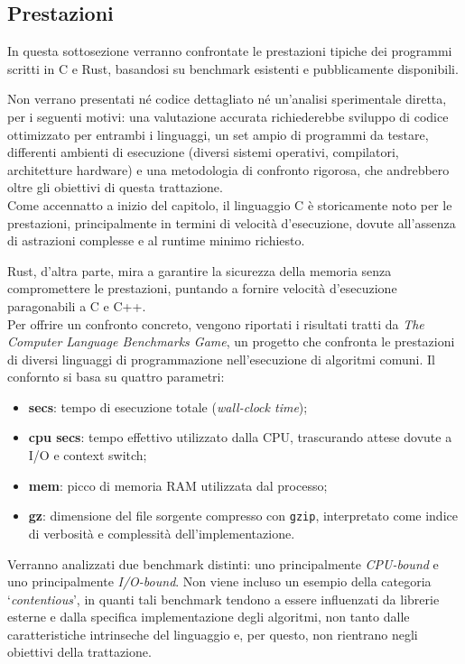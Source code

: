 \subsection{Prestazioni}
In questa sottosezione verranno confrontate le prestazioni tipiche dei programmi scritti in C e Rust, basandosi
su benchmark esistenti e pubblicamente disponibili.

Non verrano presentati né codice dettagliato né un'analisi sperimentale diretta, per i seguenti motivi: una valutazione accurata
richiederebbe sviluppo di codice ottimizzato per entrambi i linguaggi, un set ampio di programmi da testare, differenti ambienti di esecuzione (diversi sistemi operativi, compilatori, architetture hardware) e una metodologia
di confronto rigorosa, che andrebbero oltre gli obiettivi di questa trattazione. \hfill
\vspace{10pt}\\
\noindent Come accennatto a inizio del capitolo, il linguaggio C è storicamente noto per le prestazioni, principalmente in termini di velocità d'esecuzione, dovute all'assenza di astrazioni
complesse e al runtime minimo richiesto. 

Rust, d'altra parte, mira a garantire la sicurezza della memoria senza compromettere le prestazioni, puntando a fornire velocità d'esecuzione paragonabili a C e C++. \hfill
\vspace{10pt}\\
\noindent Per offrire un confronto concreto, vengono riportati i risultati tratti da \textit{The Computer Language Benchmarks Game}\cite{benchmarksgame}, un progetto che
confronta le prestazioni di diversi linguaggi di programmazione nell'esecuzione di algoritmi comuni. Il confornto si basa su quattro parametri:
\begin{itemize}
    \item \textbf{secs}: tempo di esecuzione totale (\textit{wall-clock time});
    \item \textbf{cpu secs}: tempo effettivo utilizzato dalla CPU, trascurando attese dovute a I/O e context switch;
    \item \textbf{mem}: picco di memoria RAM utilizzata dal processo;
    \item \textbf{gz}: dimensione del file sorgente compresso con \texttt{gzip}, interpretato come indice di verbosità e complessità dell'implementazione.
\end{itemize}
Verranno analizzati due benchmark distinti: uno principalmente \textit{CPU-bound} e uno principalmente \textit{I/O-bound}. 
Non viene incluso un esempio della categoria `\textit{contentious}', in quanti tali benchmark tendono a essere influenzati 
da librerie esterne e dalla specifica implementazione degli algoritmi, non tanto dalle caratteristiche intrinseche del linguaggio e, per questo, 
non rientrano negli obiettivi della trattazione.

